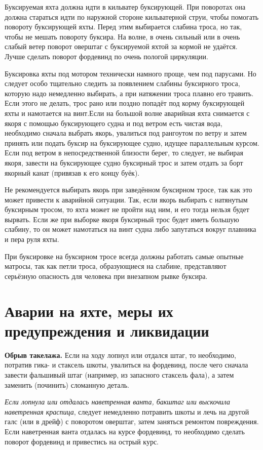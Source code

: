Буксируемая яхта должна идти в кильватер буксирующей. При поворотах
она должна стараться идти по наружной стороне кильватерной струи,
чтобы помогать повороту буксирующей яхты. Перед этим выбирается
слабина троса, но так, чтобы не мешать повороту буксира. На волне, в
очень сильный или в очень слабый ветер поворот оверштаг с буксируемой
яхтой за кормой не удаётся. Лучше сделать поворот фордевинд по очень
пологой циркуляции.

Буксировка яхты под мотором технически намного проще, чем под
парусами. Но следует особо тщательно следить за появлением слабины
буксирного троса, которую надо немедленно выбирать, а при натяжении
троса плавно его травить. Если этого не делать, трос рано или поздно
попадёт под корму буксирующей яхты и намотается на винт.Если на
большой волне аварийная яхта снимается с якоря с помощью буксирующего
судна и под ветром есть чистая вода, необходимо сначала выбрать якорь,
увалиться под рангоутом по ветру и затем принять или подать буксир на
буксирующее судно, идущее параллельным курсом. Если под ветром в
непосредственной близости берег, то следует, не выбирая якоря, завести
на буксирующее судно буксирный трос и затем отдать за борт якорный
канат (привязав к его концу буёк).

Не рекомендуется выбирать якорь при заведённом буксирном тросе, так
как это может привести к аварийной ситуации. Так, если якорь выбирать
с натянутым буксирным тросом, то яхта может не пройти над ним, и его
тогда нельзя будет вырвать. Если же при выборке якоря буксирный трос
будет иметь большую слабину, то он может намотаться на винт судна либо
запутаться вокруг плавника и пера руля яхты.

При буксировке на буксирном тросе всегда должны работать самые опытные
матросы, так как петли троса, образующиеся на слабине, представляют
серьёзную опасность для человека при внезапном рывке буксира.

\section{Аварии на яхте, меры их предупреждения и ликвидации}

\textbf{Обрыв такелажа.} Если на ходу лопнул или отдался штаг, то
необходимо, потратив гика- и стаксель шкоты, увалиться на фордевинд,
после чего сначала завести фальшивый штаг (например, из запасного
стаксель фала), а затем заменить (починить) сломанную деталь.

\textit{Если лопнула или отдалась наветренная ванта, бакштаг или выскочила
наветренная краспица}, следует немедленно потравить шкоты и лечь на
другой галс (или в дрейф) с поворотом оверштаг, затем заняться
ремонтом повреждения. Если наветренная ванта отдалась на курсе
фордевинд, то необходимо сделать поворот фордевинд и привестись на
острый курс.


